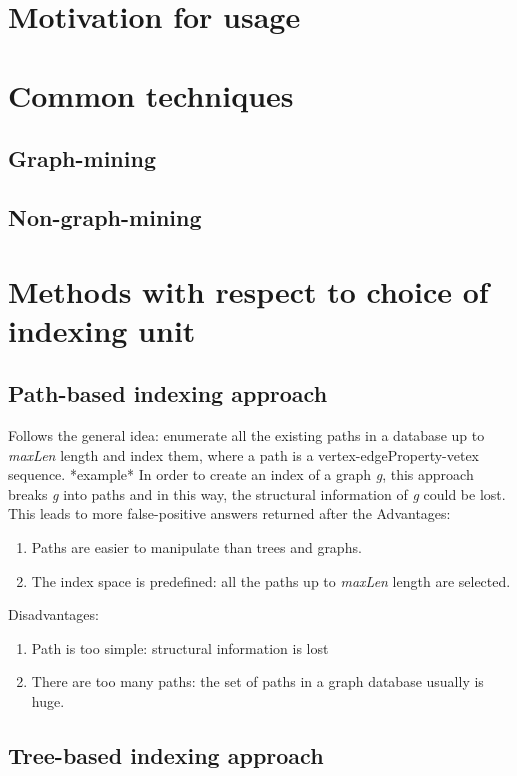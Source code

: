 \documentclass{l4proj}
\theoremstyle{definition}
\begin{document}
	\section{Motivation for usage}
	\section{Common techniques}
    	\subsection{Graph-mining}
    	\subsection{Non-graph-mining}
    \section{Methods with respect to choice of indexing unit}
        \subsection{Path-based indexing approach}
        Follows the general idea: enumerate all the existing paths in a database up to \textit{maxLen} length and index them, where a path is a vertex-edgeProperty-vetex sequence. *example*
        In order to create an index of a graph \textit{g}, this approach breaks \textit{g} into paths and in this way, the structural information of \textit{g} could be lost. This leads to more false-positive answers returned after the   
        Advantages:
        \begin{enumerate}
            \item Paths are easier to manipulate than trees and graphs.
            \item The index space is predefined: all the paths up to             \textit{maxLen} length are selected.
        \end{enumerate}
        
        Disadvantages:
        \begin{enumerate}
            \item Path is too simple: structural information is lost
            \item There are too many paths: the set of paths in a graph database usually is huge.
        \end{enumerate}
        
        
        \subsection{Tree-based indexing approach}
        
\end{document}
